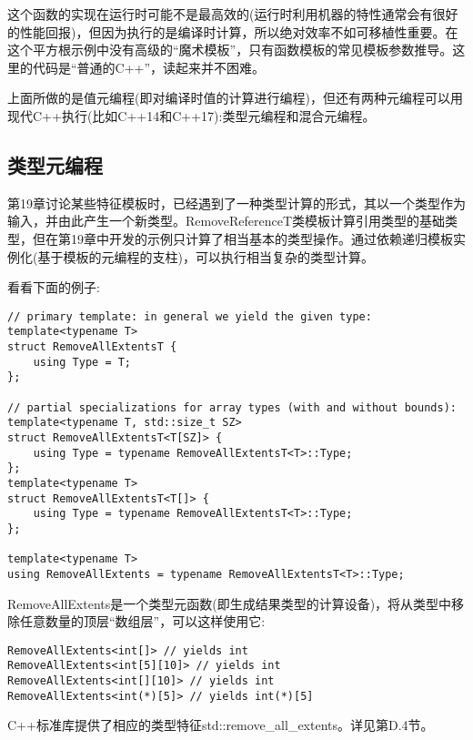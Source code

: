 这个函数的实现在运行时可能不是最高效的(运行时利用机器的特性通常会有很好的性能回报)，但因为执行的是编译时计算，所以绝对效率不如可移植性重要。在这个平方根示例中没有高级的“魔术模板”，只有函数模板的常见模板参数推导。这里的代码是“普通的C++”，读起来并不困难。

上面所做的是值元编程(即对编译时值的计算进行编程)，但还有两种元编程可以用现代C++执行(比如C++14和C++17):类型元编程和混合元编程。

\subsection{类型元编程}

第19章讨论某些特征模板时，已经遇到了一种类型计算的形式，其以一个类型作为输入，并由此产生一个新类型。RemoveReferenceT类模板计算引用类型的基础类型，但在第19章中开发的示例只计算了相当基本的类型操作。通过依赖递归模板实例化(基于模板的元编程的支柱)，可以执行相当复杂的类型计算。

看看下面的例子:

\begin{lstlisting}[style=styleCXX]
// primary template: in general we yield the given type:
template<typename T>
struct RemoveAllExtentsT {
	using Type = T;
};

// partial specializations for array types (with and without bounds):
template<typename T, std::size_t SZ>
struct RemoveAllExtentsT<T[SZ]> {
	using Type = typename RemoveAllExtentsT<T>::Type;
};
template<typename T>
struct RemoveAllExtentsT<T[]> {
	using Type = typename RemoveAllExtentsT<T>::Type;
};

template<typename T>
using RemoveAllExtents = typename RemoveAllExtentsT<T>::Type;
\end{lstlisting}

RemoveAllExtents是一个类型元函数(即生成结果类型的计算设备)，将从类型中移除任意数量的顶层“数组层”，可以这样使用它:

\begin{lstlisting}[style=styleCXX]
RemoveAllExtents<int[]> // yields int
RemoveAllExtents<int[5][10]> // yields int
RemoveAllExtents<int[][10]> // yields int
RemoveAllExtents<int(*)[5]> // yields int(*)[5]
\end{lstlisting}

\begin{tcolorbox}[colback=webgreen!5!white,colframe=webgreen!75!black]
\hspace*{0.75cm}C++标准库提供了相应的类型特征std::remove\_all\_extents。详见第D.4节。
\end{tcolorbox}

